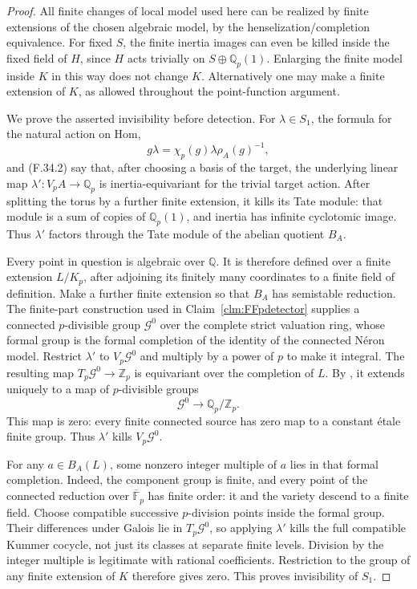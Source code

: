 \documentclass[11pt]{article}
\begin{document}
\begin{proof}
All finite changes of local model used here can be
realized by finite extensions of the chosen algebraic
model, by the henselization/completion equivalence.
For fixed \(S\), the finite inertia images can even
be killed inside the fixed field of \(H\), since
\(H\) acts trivially on \(S\oplus\mathbb Q_p(1)\).
Enlarging the finite model inside \(K\) in this way
does not change \(K\). Alternatively one may make
a finite extension of \(K\), as allowed throughout
the point-function argument.

We prove the asserted invisibility before detection.
For \(\lambda\in S_1\), the formula for the natural
action on Hom,
\[
        g\lambda=\chi_p(g)\lambda\rho_A(g)^{-1},
\]
and (F.34.2) say that, after choosing a basis of
the target, the underlying linear map
\(\lambda':V_pA\to\mathbb Q_p\) is inertia-equivariant
for the trivial target action. After splitting the
torus by a further finite extension, it kills its
Tate module: that module is a sum of copies of
\(\mathbb Q_p(1)\), and inertia has infinite
cyclotomic image. Thus \(\lambda'\) factors through
the Tate module of the abelian quotient \(B_A\).

Every point in question is algebraic over \(\mathbb Q\).
It is therefore defined over a finite extension \(L/K_p\),
after adjoining its finitely many coordinates to a
finite field of definition. Make a further finite
extension so that \(B_A\) has semistable reduction.
The finite-part construction used in
Claim~\ref{clm:FFpdetector} supplies a connected
\(p\)-divisible group \(\mathcal G^0\) over the
complete strict valuation ring, whose formal group
is the formal completion of the identity of the
connected N\'eron model. Restrict \(\lambda'\) to
\(V_p\mathcal G^0\) and multiply by a power of \(p\)
to make it integral. The resulting map
\(T_p\mathcal G^0\to\mathbb Z_p\) is equivariant
over the completion of \(L\). By
\citet[Theorem~4 and Corollary~1]{FF_Tate1967}, it
extends uniquely to a map of \(p\)-divisible groups
\[
                  \mathcal G^0\longrightarrow\mathbb Q_p/\mathbb Z_p.
\]
This map is zero: every finite connected source
has zero map to a constant \'etale finite group.
Thus \(\lambda'\) kills \(V_p\mathcal G^0\).

For any \(a\in B_A(L)\), some nonzero integer
multiple of \(a\) lies in that formal completion.
Indeed, the component group is finite, and every
point of the connected reduction over
\(\overline{\mathbb F}_p\) has finite order:
it and the variety descend to a finite field.
Choose compatible successive \(p\)-division points
inside the formal group. Their differences under
Galois lie in \(T_p\mathcal G^0\), so applying
\(\lambda'\) kills the full compatible Kummer
cocycle, not just its classes at separate finite
levels. Division by the integer multiple is
legitimate with rational coefficients. Restriction
to the group of any finite extension of \(K\)
therefore gives zero. This proves invisibility
of \(S_1\).


\end{proof}
\end{document}
